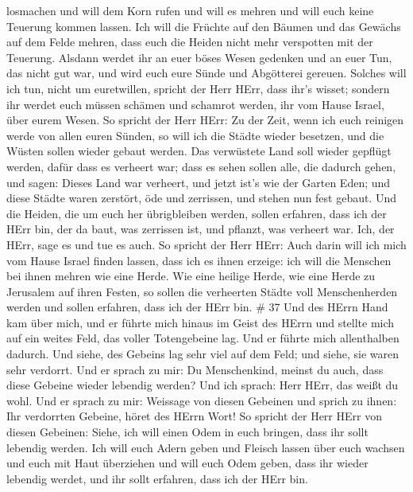 losmachen und will dem Korn rufen und will es mehren und will euch keine
Teuerung kommen lassen.  Ich will die Früchte auf den
Bäumen und das Gewächs auf dem Felde mehren, dass euch die Heiden nicht
mehr verspotten mit der Teuerung.  Alsdann werdet ihr an
euer böses Wesen gedenken und an euer Tun, das nicht gut war, und wird
euch eure Sünde und Abgötterei gereuen.  Solches will ich
tun, nicht um euretwillen, spricht der Herr HErr, dass ihr's wisset;
sondern ihr werdet euch müssen schämen und schamrot werden, ihr vom
Hause Israel, über eurem Wesen.  So spricht der Herr HErr:
Zu der Zeit, wenn ich euch reinigen werde von allen euren Sünden, so
will ich die Städte wieder besetzen, und die Wüsten sollen wieder gebaut
werden.  Das verwüstete Land soll wieder gepflügt werden,
dafür dass es verheert war; dass es sehen sollen alle, die dadurch
gehen,  und sagen: Dieses Land war verheert, und jetzt
ist's wie der Garten Eden; und diese Städte waren zerstört, öde und
zerrissen, und stehen nun fest gebaut.  Und die Heiden, die
um euch her übrigbleiben werden, sollen erfahren, dass ich der HErr bin,
der da baut, was zerrissen ist, und pflanzt, was verheert war. Ich, der
HErr, sage es und tue es auch.  So spricht der Herr HErr:
Auch darin will ich mich vom Hause Israel finden lassen, dass ich es
ihnen erzeige: ich will die Menschen bei ihnen mehren wie eine Herde.
 Wie eine heilige Herde, wie eine Herde zu Jerusalem auf
ihren Festen, so sollen die verheerten Städte voll Menschenherden werden
und sollen erfahren, dass ich der HErr bin. \# 37  Und des
HErrn Hand kam über mich, und er führte mich hinaus im Geist des HErrn
und stellte mich auf ein weites Feld, das voller Totengebeine lag.
 Und er führte mich allenthalben dadurch. Und siehe, des
Gebeins lag sehr viel auf dem Feld; und siehe, sie waren sehr verdorrt.
 Und er sprach zu mir: Du Menschenkind, meinst du auch, dass
diese Gebeine wieder lebendig werden? Und ich sprach: Herr HErr, das
weißt du wohl.  Und er sprach zu mir: Weissage von diesen
Gebeinen und sprich zu ihnen: Ihr verdorrten Gebeine, höret des HErrn
Wort!  So spricht der Herr HErr von diesen Gebeinen: Siehe,
ich will einen Odem in euch bringen, dass ihr sollt lebendig werden.
 Ich will euch Adern geben und Fleisch lassen über euch
wachsen und euch mit Haut überziehen und will euch Odem geben, dass ihr
wieder lebendig werdet, und ihr sollt erfahren, dass ich der HErr bin.
